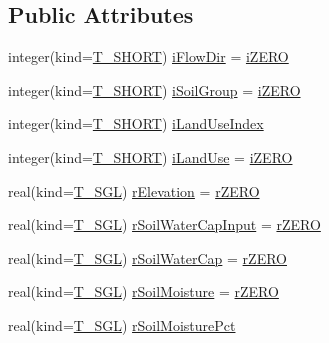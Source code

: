 \subsection*{Public Attributes}
\begin{DoxyCompactItemize}
\item 
integer(kind=\hyperlink{namespacetypes_af6b9654915a854564cb3f5ded061addc}{T\_\-SHORT}) \hyperlink{typetypes_1_1_t___c_e_l_l_a6c6f832781f3dbda7b1df22663a0c49a}{iFlowDir} = \hyperlink{namespacetypes_a694f00629aa7084d30ef27a0f233de5a}{iZERO}
\item 
integer(kind=\hyperlink{namespacetypes_af6b9654915a854564cb3f5ded061addc}{T\_\-SHORT}) \hyperlink{typetypes_1_1_t___c_e_l_l_a4332ab6c0290099b49c1df6a77ca6d89}{iSoilGroup} = \hyperlink{namespacetypes_a694f00629aa7084d30ef27a0f233de5a}{iZERO}
\item 
integer(kind=\hyperlink{namespacetypes_af6b9654915a854564cb3f5ded061addc}{T\_\-SHORT}) \hyperlink{typetypes_1_1_t___c_e_l_l_a8f28baa6d460c54a657f2fb1a6050ed3}{iLandUseIndex}
\item 
integer(kind=\hyperlink{namespacetypes_af6b9654915a854564cb3f5ded061addc}{T\_\-SHORT}) \hyperlink{typetypes_1_1_t___c_e_l_l_a4ac9cb6920a21ac9724c1ff5e34386b2}{iLandUse} = \hyperlink{namespacetypes_a694f00629aa7084d30ef27a0f233de5a}{iZERO}
\item 
real(kind=\hyperlink{namespacetypes_af3012489af4c138f271f1bce244b7e51}{T\_\-SGL}) \hyperlink{typetypes_1_1_t___c_e_l_l_aba783c11adf88985c9c541234f2f7a72}{rElevation} = \hyperlink{namespacetypes_accfc31d1cd5f1a46b3fb99e6d1975a6b}{rZERO}
\item 
real(kind=\hyperlink{namespacetypes_af3012489af4c138f271f1bce244b7e51}{T\_\-SGL}) \hyperlink{typetypes_1_1_t___c_e_l_l_a86adbade264031180153cfa16455d46c}{rSoilWaterCapInput} = \hyperlink{namespacetypes_accfc31d1cd5f1a46b3fb99e6d1975a6b}{rZERO}
\item 
real(kind=\hyperlink{namespacetypes_af3012489af4c138f271f1bce244b7e51}{T\_\-SGL}) \hyperlink{typetypes_1_1_t___c_e_l_l_ac7141ed7e08e282033530218c67158bc}{rSoilWaterCap} = \hyperlink{namespacetypes_accfc31d1cd5f1a46b3fb99e6d1975a6b}{rZERO}
\item 
real(kind=\hyperlink{namespacetypes_af3012489af4c138f271f1bce244b7e51}{T\_\-SGL}) \hyperlink{typetypes_1_1_t___c_e_l_l_a9db4438b4a4c76c906bef2c44e1187bc}{rSoilMoisture} = \hyperlink{namespacetypes_accfc31d1cd5f1a46b3fb99e6d1975a6b}{rZERO}
\item 
real(kind=\hyperlink{namespacetypes_af3012489af4c138f271f1bce244b7e51}{T\_\-SGL}) \hyperlink{typetypes_1_1_t___c_e_l_l_a413568e4642683dec97432a48aa7648d}{rSoilMoisturePct}

\end{DoxyCompactItemize}
